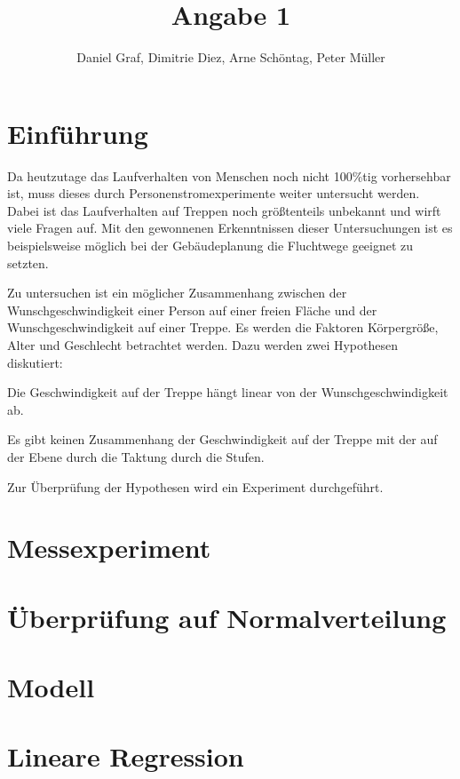 
 
\title{Angabe 1}
\providecommand{\subtitle}[1]{}
\subtitle{Untertitel}
\author{Daniel Graf, Dimitrie Diez, Arne Schöntag, Peter Müller}
\date{}


\maketitle


\tableofcontents

\section{Einführung}
Da heutzutage das Laufverhalten von Menschen noch nicht 100\%tig vorhersehbar ist, muss dieses durch Personenstromexperimente weiter untersucht werden. Dabei ist das Laufverhalten auf Treppen noch größtenteils unbekannt und wirft viele Fragen auf. Mit den gewonnenen Erkenntnissen dieser Untersuchungen ist es beispielsweise möglich bei der Gebäudeplanung die Fluchtwege geeignet zu setzten.

Zu untersuchen ist ein möglicher Zusammenhang zwischen der Wunschgeschwindigkeit einer Person auf einer freien Fläche und der Wunschgeschwindigkeit auf einer Treppe. Es werden die Faktoren Körpergröße, Alter und Geschlecht betrachtet werden.
Dazu werden zwei Hypothesen diskutiert:
\begin{list}{-}{}
	\item Die Geschwindigkeit auf der Treppe hängt linear von der Wunschgeschwindigkeit ab.
	\item Es gibt keinen Zusammenhang der Geschwindigkeit auf der Treppe mit der auf der Ebene durch die Taktung durch die Stufen.
\end{list}
 
Zur Überprüfung der Hypothesen wird ein Experiment durchgeführt.

\section{Messexperiment}
\section{Überprüfung auf Normalverteilung}
\section{Modell}
\section{Lineare Regression}
